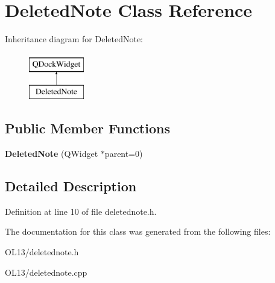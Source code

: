 \hypertarget{class_deleted_note}{}\section{Deleted\+Note Class Reference}
\label{class_deleted_note}
Inheritance diagram for Deleted\+Note\+:\begin{figure}[H]
\begin{center}
\leavevmode
\includegraphics[height=2.000000cm]{class_deleted_note}
\end{center}
\end{figure}
\subsection*{Public Member Functions}
\begin{DoxyCompactItemize}
\item 
\mbox{\label{class_deleted_note_a23fe178b1e3f593b9ac1957e44271e7e}} 
{\bfseries Deleted\+Note} (Q\+Widget $\ast$parent=0)
\end{DoxyCompactItemize}


\subsection{Detailed Description}


Definition at line 10 of file deletednote.\+h.



The documentation for this class was generated from the following files\+:\begin{DoxyCompactItemize}
\item 
O\+L13/deletednote.\+h\item 
O\+L13/deletednote.\+cpp\end{DoxyCompactItemize}
